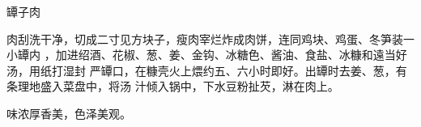 \begin{recipe}{罈子肉}

\ingredients


\cooking

肉刮洗干净，切成二寸见方块子，瘦肉宰烂炸成肉饼，连同鸡块、鸡蛋、冬笋装一小罈内
，加进绍酒、花椒、葱、姜、金钩、冰糖色、酱油、食盐、冰糠和遠当好汤，用纸打湿封
严罈口，在糠壳火上煨约五、六小时即好。出罈时去姜、葱，有条理地盛入菜盘中，将汤
汁倾入锅中，下水豆粉扯芡，淋在肉上。

\notes

味浓厚香美，色泽美观。

\end{recipe}


